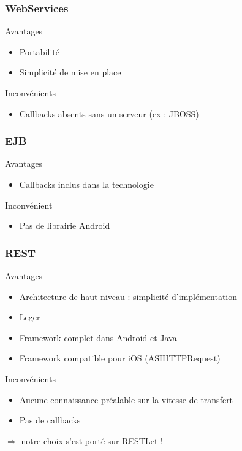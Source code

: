 \begin{frame}[c]
	\frametitle{WebServices}
	\begin{block}{Avantages}
		\begin{itemize}
			\item Portabilité
			\item Simplicité de mise en place
		\end{itemize}
	\end{block}
	\begin{block}{Inconvénients}
		\begin{itemize}
			\item Callbacks absents sans un serveur (ex : JBOSS)
		\end{itemize}
	\end{block}
\end{frame}

\begin{frame}[c]
	\frametitle{EJB}
	\begin{block}{Avantages}
		\begin{itemize}
			\item Callbacks inclus dans la technologie 
		\end{itemize}
	\end{block}
	\begin{block}{Inconvénient}
		\begin{itemize}
			\item Pas de librairie Android
		\end{itemize}
	\end{block}
\end{frame}

\begin{frame}[c]
	\frametitle{REST}
	\begin{block}{Avantages}
		\begin{itemize}
			\item Architecture de haut niveau : simplicité d’implémentation
			\item Leger
			\item Framework complet dans Android et Java
			\item Framework compatible pour iOS (ASIHTTPRequest)
		\end{itemize}
	\end{block}
	\begin{block}{Inconvénients}
		\begin{itemize}
			\item Aucune connaissance préalable sur la vitesse de transfert
			\item Pas de callbacks
		\end{itemize}
	\end{block}
	\begin{center}
		$\Rightarrow$ notre choix s'est porté sur RESTLet !
	\end{center}
\end{frame}

